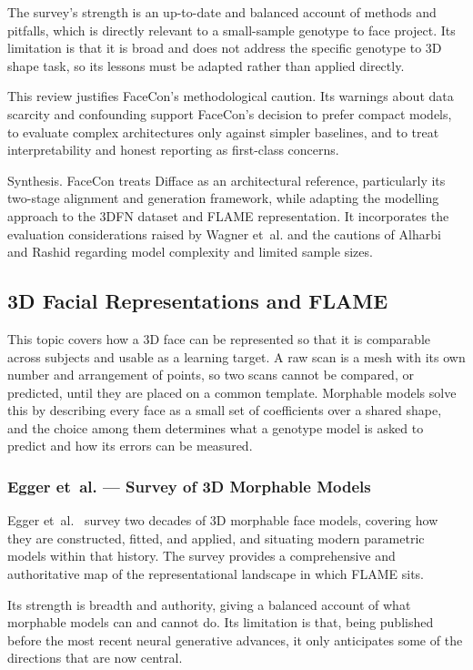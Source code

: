 The survey's strength is an up-to-date and balanced account of methods and pitfalls, which is directly relevant to a small-sample genotype to face project. Its limitation is that it is broad and does not address the specific genotype to 3D shape task, so its lessons must be adapted rather than applied directly.

This review justifies FaceCon's methodological caution. Its warnings about data scarcity and confounding support FaceCon's decision to prefer compact models, to evaluate complex architectures only against simpler baselines, and to treat interpretability and honest reporting as first-class concerns.

Synthesis. FaceCon treats Difface as an architectural reference, particularly its two-stage alignment and generation framework, while adapting the modelling approach to the 3DFN dataset and FLAME representation. It incorporates the evaluation considerations raised by Wagner et~al. and the cautions of Alharbi and Rashid regarding model complexity and limited sample sizes.

\subsection{3D Facial Representations and FLAME}
This topic covers how a 3D face can be represented so that it is comparable across subjects and usable as a learning target. A raw scan is a mesh with its own number and arrangement of points, so two scans cannot be compared, or predicted, until they are placed on a common template. Morphable models solve this by describing every face as a small set of coefficients over a shared shape, and the choice among them determines what a genotype model is asked to predict and how its errors can be measured.

\subsubsection{Egger et~al. --- Survey of 3D Morphable Models}
Egger et~al.~\cite{ref:egger} survey two decades of 3D morphable face models, covering how they are constructed, fitted, and applied, and situating modern parametric models within that history. The survey provides a comprehensive and authoritative map of the representational landscape in which FLAME sits.

Its strength is breadth and authority, giving a balanced account of what morphable models can and cannot do. Its limitation is that, being published before the most recent neural generative advances, it only anticipates some of the directions that are now central.

